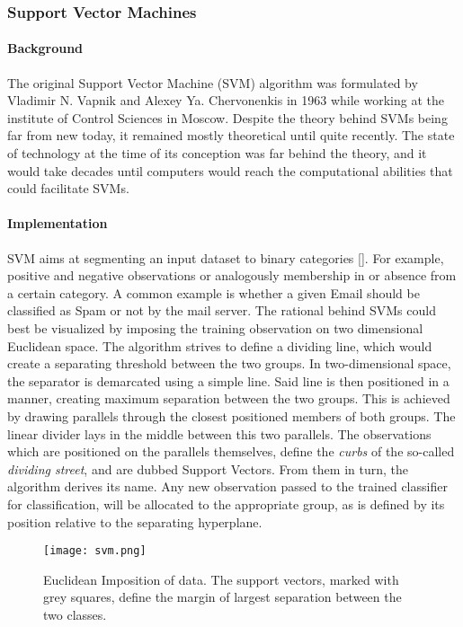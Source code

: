 \subsubsection{Support Vector Machines}
	
	\paragraph{Background}
	The original Support Vector Machine (SVM) algorithm was formulated by Vladimir N. Vapnik and Alexey Ya. Chervonenkis in 1963 while working at the institute of Control Sciences in Moscow. Despite the theory behind SVMs being far from new today, it remained mostly theoretical until quite recently. The state of technology at the time of its conception was far behind the theory, and it would take decades until computers would reach the computational abilities that could facilitate SVMs.
	
	\paragraph{Implementation}
	SVM aims at segmenting an input dataset to binary categories [\cite{SVM_burges1998tutorial}]. For example, positive and negative observations or analogously membership in or absence from a certain category. A common example is whether a given Email should be classified as Spam or not by the mail server. The rational behind SVMs could best be visualized by imposing the training observation on two dimensional Euclidean space. The algorithm strives to define a dividing line, which would create a separating threshold between the two groups. In two-dimensional space, the separator is demarcated using a simple line. Said line is then positioned in a manner, creating maximum separation between the two groups. This is achieved by drawing parallels through the closest positioned members of both groups. The linear divider lays in the middle between this two parallels. The observations which are positioned on the parallels themselves, define the \textit{curbs} of the so-called \textit{dividing street}, and are dubbed Support Vectors. From them in turn, the algorithm derives its name. Any new observation passed to the trained classifier for classification, will be allocated to the appropriate group, as is defined by its position relative to the separating hyperplane. 
	
	\begin{figure}[h]
		\centering
		\captionsetup{width=0.8\textwidth}
		\texttt{[image: svm.png]}
		\caption[SVM in Euclidean Space]{
			\footnotesize{
				Euclidean Imposition of data. The support vectors, marked with grey squares, define the margin of largest separation between the two classes.
			}
		} \cite{SVM_cortes1995support}
	\end{figure}

